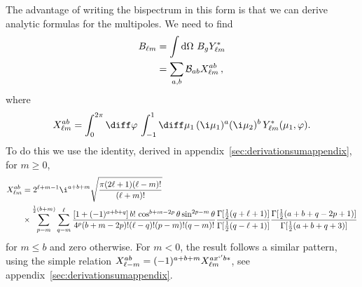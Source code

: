 The advantage of writing the bispectrum in this form is that we can derive analytic formulas for the multipoles. We need to find
\begin{align}
B_{\ell m} &= \int{\rm d}\Omega \,\,B_g Y^*_{\ell m} \nonumber \\
&= \sum_{a,b} \mathcal{B}_{ab} X_{\ell m}^{ab} \label{eq:xabexp} \,,
\end{align}
where 
\begin{equation} X_{\ell m}^{ab} = \int_0^{2\pi} \diff\varphi\, \int_{-1}^1 \diff\mu_1\, (\i \mu_1)^a (\i \mu_2)^b \,Y_{\ell m}^*(\mu_1,\varphi).
\end{equation}
To do this we use the identity, derived in appendix~\ref{sec:derivationsumappendix}, for \(m \geq 0\),
\begin{align}\label{eq:sumformula} X_{\ell m}^{ab} &= 2^{\ell+m-1}\i^{a+b+m}\sqrt{\frac{\pi(2\ell+1)(\ell-m)!}{(\ell+m)!}}\nonumber\\
&\times
\sum_{p=m}^{\frac{1}{2}(b+m)}\sum_{q=m}^{\ell}
\frac{[1+(-1)^{a+b+q}]\,b!\,\cos^{b+m-2p}\theta\sin^{2p-m}\theta}{4^p(b+m-2p)!(\ell-q)!(p-m)!(q-m)!}
\frac{\Gamma[\frac{1}{2}(q+\ell+1)]}{\Gamma[\frac{1}{2}(q-\ell+1)]}
\frac{\Gamma[\frac{1}{2}(a+b +q-2p+1)]}{\Gamma[\frac{1}{2}(a+b+q+3)]}
\end{align}
for $m\leq b$ and zero otherwise. For $m < 0$, the result follows a similar pattern, using the simple relation \(X_{\ell -m}^{ab} = (-1)^{a+b+m} X_{\ell m}^{ax`'b*}\), see appendix~\ref{sec:derivationsumappendix}. 

